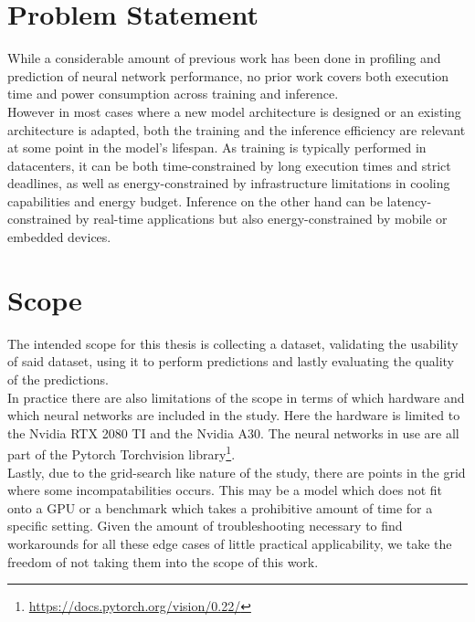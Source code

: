 \section{Problem Statement}
While a considerable amount of previous work has been done in
profiling and prediction of neural network performance, no prior work covers both execution time and power consumption across training and inference.\\
However in most cases where a new model architecture is designed or an existing architecture is adapted, both the training and the inference efficiency are relevant at some point in the model's lifespan. As training is typically performed in datacenters, it can be both time-constrained by long execution times and strict deadlines, as well as energy-constrained by infrastructure limitations in cooling capabilities and energy budget. Inference on the other hand can be latency-constrained by real-time applications but also energy-constrained by mobile or embedded devices. 



\section{Scope}
The intended scope for this thesis is collecting a dataset, validating the usability of said dataset, using it to perform predictions and lastly evaluating the quality of the predictions. \\
In practice there are also limitations of the scope in terms of which hardware and which neural networks are included in the study. Here the hardware is limited to the Nvidia RTX 2080 TI and the Nvidia A30. The neural networks in use are all part of the Pytorch Torchvision library\footnote{\url{https://docs.pytorch.org/vision/0.22/}}. \\
Lastly, due to the grid-search like nature of the study, there are points in the grid where some incompatabilities occurs. This may be a model which does not fit onto a GPU or a benchmark which takes a prohibitive amount of time for a specific setting. Given the amount of troubleshooting necessary to find workarounds for all these edge cases of little practical applicability, we take the freedom of not taking them into the scope of this work.


